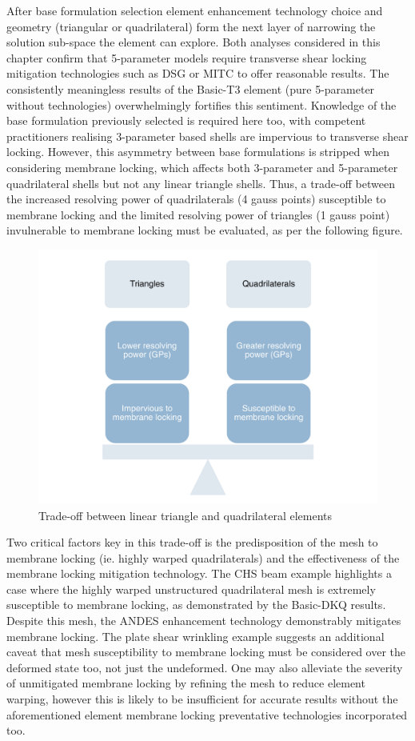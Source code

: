 After base formulation selection element enhancement technology choice and geometry (triangular or quadrilateral) form the next layer of narrowing the solution sub-space the element can explore. Both analyses considered in this chapter confirm that 5-parameter models require transverse shear locking mitigation technologies such as DSG or MITC to offer reasonable results. The consistently meaningless results of the Basic-T3 element (pure 5-parameter without technologies) overwhelmingly fortifies this sentiment. Knowledge of the base formulation previously selected is required here too, with competent practitioners realising 3-parameter based shells are impervious to transverse shear locking. However, this asymmetry between base formulations is stripped when considering membrane locking, which affects both 3-parameter and 5-parameter quadrilateral shells but not any linear triangle shells. Thus, a trade-off between the increased resolving power of quadrilaterals (4 gauss points) susceptible to membrane locking and the limited resolving power of triangles (1 gauss point) invulnerable to membrane locking must be evaluated, as per the following figure. 

\begin{figure}[H]
	\centering
	\def\svgwidth{\columnwidth}
	\includegraphics[width=12cm]{images/MODELLING_2.pdf}
	\caption{Trade-off between linear triangle and quadrilateral elements}
	\label{pic:applications11}
\end{figure}

Two critical factors key in this trade-off is the predisposition of the mesh to membrane locking (ie. highly warped quadrilaterals) and the effectiveness of the membrane locking mitigation technology. The CHS beam example highlights a case where the highly warped unstructured quadrilateral mesh is extremely susceptible to membrane locking, as demonstrated by the Basic-DKQ results. Despite this mesh, the ANDES enhancement technology demonstrably mitigates membrane locking. The plate shear wrinkling example suggests an additional caveat that mesh susceptibility to membrane locking must be considered over the deformed state too, not just the undeformed. One may also alleviate the severity of unmitigated membrane locking by refining the mesh to reduce element warping, however this is likely to be insufficient for accurate results without the aforementioned element membrane locking preventative technologies incorporated too.

